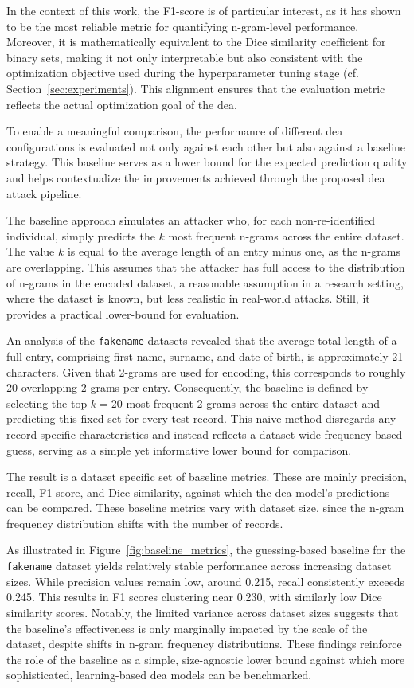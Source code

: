 In the context of this work, the F1-score is of particular interest, as it has shown to be the most reliable metric for quantifying n-gram-level performance.
Moreover, it is mathematically equivalent to the Dice similarity coefficient for binary sets, making it not only interpretable but also consistent with the optimization objective used during the hyperparameter tuning stage (cf. Section~\ref{sec:experiments}).
This alignment ensures that the evaluation metric reflects the actual optimization goal of the \ac{dea}.

To enable a meaningful comparison, the performance of different \ac{dea} configurations is evaluated not only against each other but also against a baseline strategy.
This baseline serves as a lower bound for the expected prediction quality and helps contextualize the improvements achieved through the proposed \ac{dea} attack pipeline.

The baseline approach simulates an attacker who, for each non-re-identified individual, simply predicts the $k$ most frequent n-grams across the entire dataset.
The value $k$ is equal to the average length of an entry minus one, as the n-grams are overlapping.
This assumes that the attacker has full access to the distribution of n-grams in the encoded dataset, a reasonable assumption in a research setting, where the dataset is known, but less realistic in real-world attacks.
Still, it provides a practical lower-bound for evaluation.

An analysis of the \texttt{fakename} datasets revealed that the average total length of a full entry, comprising first name, surname, and date of birth, is approximately 21 characters.
Given that 2-grams are used for encoding, this corresponds to roughly 20 overlapping 2-grams per entry.
Consequently, the baseline is defined by selecting the top $k=20$ most frequent 2-grams across the entire dataset and predicting this fixed set for every test record.
This naive method disregards any record specific characteristics and instead reflects a dataset wide frequency-based guess, serving as a simple yet informative lower bound for comparison.

The result is a dataset specific set of baseline metrics.
These are mainly precision, recall, F1-score, and Dice similarity, against which the \ac{dea} model's predictions can be compared.
These baseline metrics vary with dataset size, since the n-gram frequency distribution shifts with the number of records.

As illustrated in Figure~\ref{fig:baseline_metrics}, the guessing-based baseline for the \texttt{fakename} dataset yields relatively stable performance across increasing dataset sizes.
While precision values remain low, around 0.215, recall consistently exceeds 0.245.
This results in F1 scores clustering near 0.230, with similarly low Dice similarity scores.
Notably, the limited variance across dataset sizes suggests that the baseline's effectiveness is only marginally impacted by the scale of the dataset, despite shifts in n-gram frequency distributions.
These findings reinforce the role of the baseline as a simple, size-agnostic lower bound against which more sophisticated, learning-based \ac{dea} models can be benchmarked.

